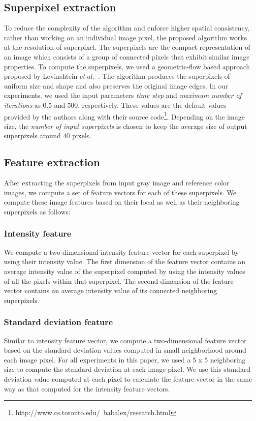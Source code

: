 \documentclass[twocolumn]{svjour3}          %
\begin{document}
\subsection{Superpixel extraction}
To reduce the complexity of the algorithm and enforce higher spatial consistency, rather than working on an individual image pixel, the proposed algorithm works at the resolution of superpixel. The superpixels are the compact representation of an image which consists of a group of connected pixels that exhibit similar image properties. To compute the superpixels, we used a geometric-flow based approach proposed by Levinshtein $et\ al.$~\cite{Alex09}. The algorithm produces the superpixels of uniform size and shape and also preserves the original image edges. In our experiments, we used the input parameters \emph{time step} and \emph{maximum number of iterations} as 0.5 and 500, respectively. These values are the default values provided by the authors along with their source code\footnote{http://www.cs.toronto.edu/~babalex/research.html}. Depending on the image size, the \emph{number of input superpixels} is chosen to keep the average size of output superpixels around 40 pixels.


\subsection{Feature extraction}
After extracting the superpixels from input gray image and reference color images, we compute a set of feature vectors for each of these superpixels. We compute these image features based on their local as well as their neighboring superpixels as follows:

\subsubsection{Intensity feature}
We compute a two-dimensional intensity feature vector for each superpixel by using their intensity value. The first dimension of the feature vector contains an average intensity value of the superpixel computed by using the intensity values of all the pixels within that superpixel. The second dimension of the feature vector contains an average intensity value of its connected neighboring superpixels.

\subsubsection{Standard deviation feature}
Similar to intensity feature vector, we compute a two-dimensional feature vector based on the standard deviation values computed in small neighborhood around each image pixel. For all experiments in this paper, we used a $5$ x $5$ neighboring size to compute the standard deviation at each image pixel. We use this standard deviation value computed at each pixel to calculate the feature vector in the same way as that computed for the intensity feature vectors.
\end{document}
